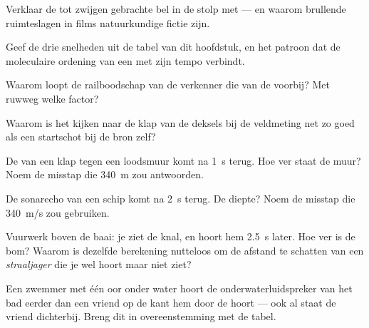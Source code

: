 \begin{exercise}[$\star$]\label{exo:g7:sound-production:3}
Verklaar de tot zwijgen gebrachte bel in de stolp met
 --- en waarom brullende ruimteslagen in films
natuurkundige fictie zijn.
\end{exercise}

\begin{exercise}[$\star$]\label{exo:g7:sound-production:4}
Geef de drie snelheden uit de tabel van dit hoofdstuk, en het
patroon dat de moleculaire ordening van een  met zijn tempo
verbindt.
\end{exercise}

\begin{exercise}[$\star$]\label{exo:g7:sound-production:5}
Waarom loopt de railboodschap van de verkenner die van de
 voorbij? Met ruwweg welke factor?
\end{exercise}

\begin{exercise}[$\star$]\label{exo:g7:sound-production:6}
Waarom is het kijken naar de klap van de deksels bij de veldmeting net
zo goed als een startschot bij de bron zelf?
\end{exercise}

\begin{exercise}[$\star$]\label{exo:g7:sound-production:7}
De  van een klap tegen een loodsmuur komt na \qty{1}{s} terug.
Hoe ver staat de muur? Noem de misstap die \qty{340}{m} zou
antwoorden.
\end{exercise}

\begin{exercise}[$\star$]\label{exo:g7:sound-production:8}
De sonarecho van een schip komt na \qty{2}{s} terug. De diepte?
Noem de misstap die \qty{340}{m/s} zou gebruiken.
\end{exercise}

\begin{exercise}[$\star\star$]\label{exo:g7:sound-production:9}
Vuurwerk boven de baai: je ziet de knal, en hoort hem \qty{2.5}{s}
later. Hoe ver is de bom? Waarom is dezelfde berekening nutteloos om
de afstand te schatten van een \emph{straaljager} die je wel hoort
maar niet ziet?
\end{exercise}

\begin{exercise}[$\star\star$]\label{exo:g7:sound-production:10}
Een zwemmer met één oor onder water hoort de onderwaterluidspreker van
het bad eerder dan een vriend op de kant hem door de  hoort
--- ook al staat de vriend dichterbij. Breng dit in overeenstemming
met de tabel.
\end{exercise}

